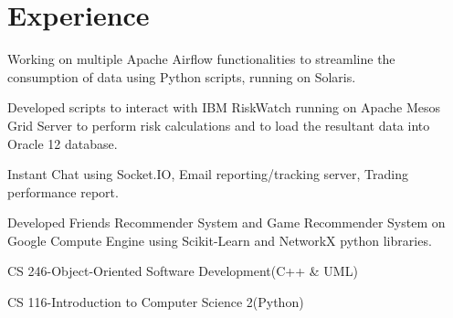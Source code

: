 \documentclass[]{Vishnu-Resume}
\begin{document}
\hfill
\begin{minipage}[t]{0.66\textwidth} 


\section{Experience}

\vspace{\topsep} %
\begin{tightemize}\item Working on multiple Apache Airflow functionalities to streamline the consumption of data using Python scripts, running on Solaris.
\item Developed scripts to interact with IBM RiskWatch running on Apache Mesos Grid Server to perform risk calculations and to load the resultant data into Oracle 12 database.
\end{tightemize}
\sectionsep

\begin{tightemize}\item Instant Chat using Socket.IO, Email reporting/tracking server, Trading performance report.
\end{tightemize}
\sectionsep

\begin{tightemize}\item Developed Friends Recommender System and Game Recommender System on
Google Compute Engine using Scikit-Learn and NetworkX python libraries.
\end{tightemize}
\sectionsep

\begin{tightemize}\item CS 246-Object-Oriented Software Development(C++ & UML)
\item CS 116-Introduction to Computer Science 2(Python)
\end{tightemize}
\sectionsep


\end{minipage}
\end{document}
